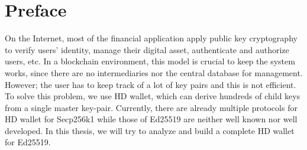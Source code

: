 \chapter*{Preface}
\thispagestyle{fancy}
\label{preface}
\hspace*{5cm}

On the Internet, most of the financial application apply public key cryptography to verify users' identity, manage their digital asset, authenticate and authorize users, etc. In a blockchain environment, this model is crucial to keep the system works, since there are no intermediaries nor the central database for management. However; the user has to keep track of a lot of key pairs and this is not efficient.
To solve this problem, we use HD wallet, which can derive hundreds of child keys from a single master key-pair. Currently, there are already multiple protocols for HD wallet for Secp256k1 while those of Ed25519 are neither well known nor well developed. In this thesis, we will try to analyze and build a complete HD wallet for Ed25519.

\cleardoublepage
